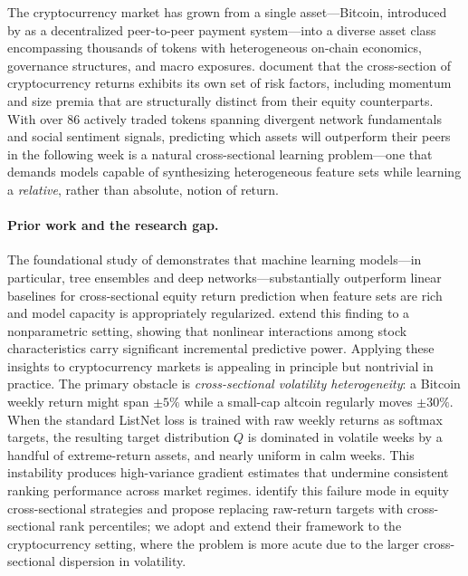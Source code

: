 The cryptocurrency market has grown from a single asset—Bitcoin, introduced by
\citet{nakamoto2008bitcoin} as a decentralized peer-to-peer payment system—into
a diverse asset class encompassing thousands of tokens with heterogeneous
on-chain economics, governance structures, and macro exposures.
\citet{liu2022cryptocurrency} document that the cross-section of cryptocurrency
returns exhibits its own set of risk factors, including momentum and size premia
that are structurally distinct from their equity counterparts.
With over 86 actively traded tokens spanning divergent network fundamentals
and social sentiment signals, predicting which assets will outperform their peers
in the following week is a natural cross-sectional learning problem—one that
demands models capable of synthesizing heterogeneous feature sets while learning
a \emph{relative}, rather than absolute, notion of return.

\paragraph{Prior work and the research gap.}
The foundational study of \citet{gu2020empirical} demonstrates that machine
learning models—in particular, tree ensembles and deep networks—substantially
outperform linear baselines for cross-sectional equity return prediction when
feature sets are rich and model capacity is appropriately regularized.
\citet{freyberger2020dissecting} extend this finding to a nonparametric
setting, showing that nonlinear interactions among stock characteristics carry
significant incremental predictive power.
Applying these insights to cryptocurrency markets is appealing in principle
but nontrivial in practice.
The primary obstacle is \emph{cross-sectional volatility heterogeneity}: a
Bitcoin weekly return might span $\pm 5\%$ while a small-cap altcoin regularly
moves $\pm 30\%$.
When the standard ListNet loss \citep{cao2007learning} is trained with raw
weekly returns as softmax targets, the resulting target distribution $Q$ is
dominated in volatile weeks by a handful of extreme-return assets, and nearly
uniform in calm weeks.
This instability produces high-variance gradient estimates that undermine
consistent ranking performance across market regimes.
\citet{poh2021building} identify this failure mode in equity cross-sectional
strategies and propose replacing raw-return targets with cross-sectional rank
percentiles; we adopt and extend their framework to the cryptocurrency setting,
where the problem is more acute due to the larger cross-sectional dispersion
in volatility.

